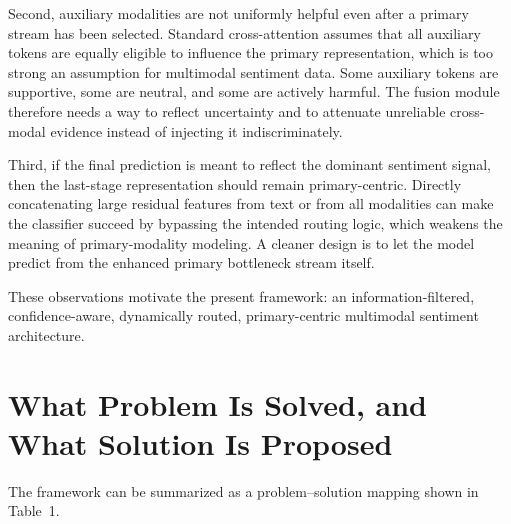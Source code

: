 \documentclass[11pt]{article}
\begin{document}
Second, auxiliary modalities are not uniformly helpful even after a primary
stream has been selected. Standard cross-attention assumes that all auxiliary
tokens are equally eligible to influence the primary representation, which is too
strong an assumption for multimodal sentiment data. Some auxiliary tokens are
supportive, some are neutral, and some are actively harmful. The fusion module
therefore needs a way to reflect uncertainty and to attenuate unreliable
cross-modal evidence instead of injecting it indiscriminately.

Third, if the final prediction is meant to reflect the dominant sentiment signal,
then the last-stage representation should remain primary-centric. Directly
concatenating large residual features from text or from all modalities can make
the classifier succeed by bypassing the intended routing logic, which weakens
the meaning of primary-modality modeling. A cleaner design is to let the model
predict from the enhanced primary bottleneck stream itself.

These observations motivate the present framework: an information-filtered,
confidence-aware, dynamically routed, primary-centric multimodal sentiment
architecture.

\section{What Problem Is Solved, and What Solution Is Proposed}

The framework can be summarized as a problem--solution mapping shown in Table~1.
\end{document}
